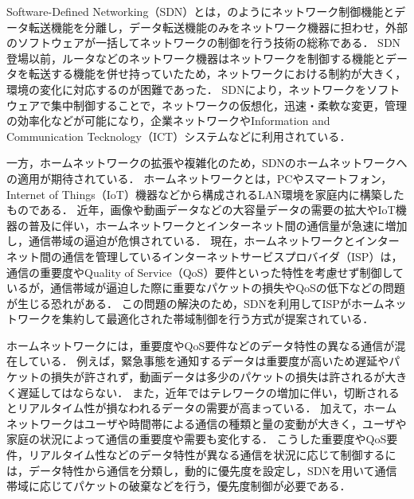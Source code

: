 \documentclass[a4paper,11pt,uplatex]{ujreport}
\begin{document}
  Software-Defined Networking（SDN）とは，のようにネットワーク制御機能とデータ転送機能を分離し，データ転送機能のみをネットワーク機器に担わせ，外部のソフトウェアが一括してネットワークの制御を行う技術の総称である．
  SDN登場以前，ルータなどのネットワーク機器はネットワークを制御する機能とデータを転送する機能を併せ持っていたため，ネットワークにおける制約が大きく，環境の変化に対応するのが困難であった．
  SDNにより，ネットワークをソフトウェアで集中制御することで，ネットワークの仮想化，迅速・柔軟な変更，管理の効率化などが可能になり，企業ネットワークやInformation and Communication Tecknology（ICT）システムなどに利用されている\cite{NEC}．\par
  一方，ホームネットワークの拡張や複雑化のため，SDNのホームネットワークへの適用が期待されている．
  ホームネットワークとは，PCやスマートフォン，Internet of Things（IoT）機器などから構成されるLAN環境を家庭内に構築したものである．
  近年，画像や動画データなどの大容量データの需要の拡大やIoT機器の普及に伴い，ホームネットワークとインターネット間の通信量が急速に増加し，通信帯域の逼迫が危惧されている\cite{ガイドライン}．
  現在，ホームネットワークとインターネット間の通信を管理しているインターネットサービスプロバイダ（ISP）は，通信の重要度やQuality of Service（QoS）要件といった特性を考慮せず制御しているが，通信帯域が逼迫した際に重要なパケットの損失やQoSの低下などの問題が生じる恐れがある．
  この問題の解決のため，SDNを利用してISPがホームネットワークを集約して最適化された帯域制御を行う方式が提案されている\cite{Framework}．\par
  ホームネットワークには，重要度やQoS要件などのデータ特性の異なる通信が混在している．
  例えば，緊急事態を通知するデータは重要度が高いため遅延やパケットの損失が許されず，動画データは多少のパケットの損失は許されるが大きく遅延してはならない．
  また，近年ではテレワークの増加に伴い，切断されるとリアルタイム性が損なわれるデータの需要が高まっている．
  加えて，ホームネットワークはユーザや時間帯による通信の種類と量の変動が大きく，ユーザや家庭の状況によって通信の重要度や需要も変化する．
  こうした重要度やQoS要件，リアルタイム性などのデータ特性が異なる通信を状況に応じて制御するには，データ特性から通信を分類し，動的に優先度を設定し，SDNを用いて通信帯域に応じてパケットの破棄などを行う，優先度制御が必要である．
\end{document}
